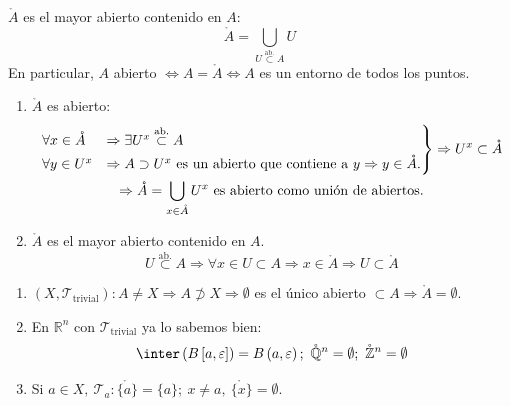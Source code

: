 \begin{prop}
$\mathring{A}$ es el mayor abierto contenido en $A$: 
\[
\mathring{A} = \bigcup_{U \stackrel{\text{ab.}}{\subset} A} U
\]
En particular, $A$ abierto $\Leftrightarrow A = \mathring{A} \Leftrightarrow A$ es un entorno de todos los puntos.    
\end{prop}
\begin{demo}
\begin{enumerate}
    \item $\mathring{A}$ es abierto: 
    \begin{gather*}
        \begin{rcases}
        \forall x \in \mathring{A} &\Rightarrow \exists U^x \stackrel{\text{ab.}}{\subset}  A\\
        \forall y \in U^x &\Rightarrow A \supset U^x \text{ es un abierto que contiene a } y \Rightarrow y \in \mathring{A}.\\
        \end{rcases} \Rightarrow U^x \subset \mathring{A}\\
        \Rightarrow \mathring{A} = \bigcup_{x \in \mathring{A}} U^x \text{ es abierto como unión de abiertos}
    .\end{gather*}
    \item $\mathring{A}$ es el mayor abierto contenido en $A$.
    \[
    U \stackrel{\text{ab.}}{\subset} A \Rightarrow \forall x \in U \subset A \Rightarrow x \in \mathring{A} \Rightarrow U \subset \mathring{A} 
    \]
\end{enumerate}
\end{demo}

\begin{ej}
\begin{enumerate}
    \item $\left( X, \mathcal{T}_{\text{trivial}} \right): A \neq X \Rightarrow A \not \supset X \Rightarrow \emptyset$ es el único abierto $\subset A \Rightarrow \mathring{A} = \emptyset$.

    \item En $\mathbb{R}^n$ con $\mathcal{T}_{\text{trivial}}$ ya lo sabemos bien:
    \[
    \inter\left( B\left[ a, \varepsilon \right] \right)  = B\left( a, \varepsilon \right);\ \mathring{\mathbb{Q}}^n = \emptyset;\ \mathring{\mathbb{Z}}^n = \emptyset
    \]
    \item Si $a \in X,\ \mathcal{T}_a : \mathring{\{a\}} = \{a\};\ x \neq a,\ \mathring{\{x\}} = \emptyset$.
\end{enumerate}
\end{ej}

